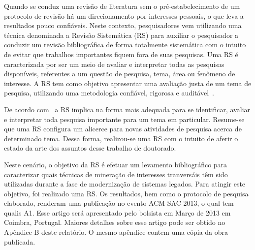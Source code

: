 Quando se conduz uma revisão de literatura sem o pré-estabelecimento de um protocolo de revisão há um direcionamento por interesses pessoais, o que leva a resultados pouco confiáveis. Neste contexto, pesquisadores vem utilizando uma técnica denominada a Revisão Sistemática (RS) para auxiliar o pesquisador a conduzir um revisão bibliográfica de forma totalmente sistemática com o intuito de evitar que trabalhos importantes fiquem fora de suas pesquisas. Uma RS é caracterizada por ser um meio de avaliar e interpretar todas as pesquisas disponíveis, referentes a um questão de pesquisa, tema, área ou fenômeno de interesse. A RS tem como objetivo apresentar uma avaliação justa de um tema de pesquisa, utilizando uma metodologia confiável, rigorosa e auditável~\cite{kit04}.

De acordo com~\citet{kit04} a RS implica na forma mais adequada para se identificar, avaliar e interpretar toda pesquisa importante para um tema em particular. Resume-se que uma RS configura um alicerce para novas atividades de pesquisa acerca de determinado tema. Dessa forma, realizou-se uma RS com o intuito de aferir o estado da arte dos assuntos desse trabalho de doutorado.

Neste cenário, o objetivo da RS é efetuar um levamento bibliográfico para caracterizar quais técnicas de mineração de interesses tranversáis têm sido utilizadas durante a fase de modernização de sistemas legados. Para atingir este objetivo, foi realizado uma RS. Os resultados, bem como o protocolo de pesquisa elaborado, renderam uma publicação no evento ACM SAC 2013, o qual tem qualis A1. Esse artigo será apresentado pelo bolsista em Março de 2013 em Coimbra, Portugal. Maiores detalhes sobre esse artigo pode ser obtido no Apêndice B deste relatório. O mesmo apêndice contem uma cópia da obra publicada.